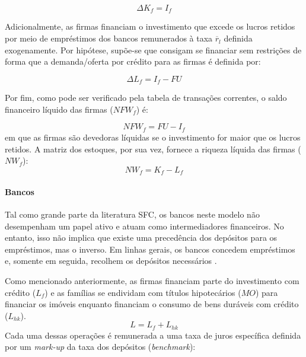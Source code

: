 \begin{equation}
    \Delta K_f = I_f
\end{equation}

Adicionalmente, as firmas financiam o investimento que excede os lucros retidos por meio de empréstimos dos bancos remunerados à taxa $\overline r_l$ definida exogenamente. Por hipótese, supõe-se que consigam se financiar sem restrições de forma que a demanda/oferta por crédito para as firmas é definida por:

\begin{equation}
    \Delta L_f = I_f - FU
\end{equation}

Por fim, como pode ser verificado pela tabela de transações correntes, o saldo financeiro líquido das firmas ($NFW_f$) é:

\begin{equation}
    NFW_f = FU - I_f
\end{equation}
em que as firmas são devedoras líquidas se o investimento for maior que os lucros retidos. 
A matriz dos estoques, por sua vez, fornece a riqueza líquida das firmas ($NW_f$):
\begin{equation}
    NW_f = K_f - L_f
\end{equation}

\paragraph*{Bancos} Tal como grande parte da literatura SFC, os bancos neste modelo não desempenham um papel ativo e atuam como intermediadores financeiros. No entanto, isso não implica que existe uma precedência dos depósitos para os empréstimos, mas o inverso. Em linhas gerais, os bancos concedem empréstimos e, somente em seguida, recolhem os depósitos necessários \cite{le_bourva_money_1992}. 

Como mencionado anteriormente, as firmas financiam parte do investimento com crédito ($L_f$) e as famílias se endividam com títulos hipotecários ($MO$) para financiar os imóveis enquanto financiam o consumo de bens duráveis com crédito ($L_{hk}$). 
\begin{equation}
L = L_f + L_{hk}
\end{equation}
Cada uma dessas operações é remunerada a uma taxa de juros específica definida por um \textit{mark-up} da taxa dos depósitos (\textit{benchmark}):

